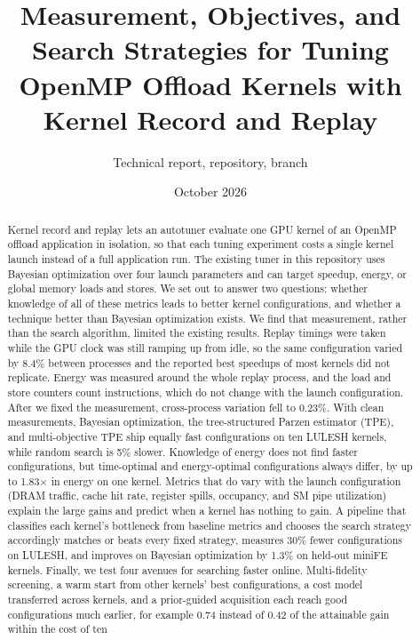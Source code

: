 \documentclass[10pt]{article}
\title{Measurement, Objectives, and Search Strategies for Tuning OpenMP Offload Kernels with Kernel Record and Replay}
\author{Technical report, \code{openmp-rr} repository, branch \code{measurement-v3}}
\date{October 2026}
\newcommand{\x}{\ensuremath{\times}}
\begin{document}
\sloppy
\maketitle

\begin{abstract}
Kernel record and replay lets an autotuner evaluate one GPU kernel of an
OpenMP offload application in isolation, so that each tuning experiment costs
a single kernel launch instead of a full application run. The existing tuner
in this repository uses Bayesian optimization over four launch parameters and
can target speedup, energy, or global memory loads and stores. We set out to
answer two questions: whether knowledge of all of these metrics leads to
better kernel configurations, and whether a technique better than Bayesian
optimization exists. We find that measurement, rather than the search
algorithm, limited the existing results. Replay timings were taken while the
GPU clock was still ramping up from idle, so the same configuration varied
by 8.4\% between processes and the reported best speedups of most kernels
did not replicate. Energy was measured around the whole replay process, and
the load and store counters count instructions, which do not change with the
launch configuration. After we fixed the measurement, cross-process variation
fell to 0.23\%. With clean measurements, Bayesian optimization, the
tree-structured Parzen estimator (TPE), and multi-objective TPE ship equally
fast configurations on ten LULESH kernels, while random search is 5\% slower.
Knowledge of energy does not find faster configurations, but time-optimal and
energy-optimal configurations always differ, by up to 1.83\x{} in energy on
one kernel. Metrics that do vary with the launch configuration (DRAM traffic,
cache hit rate, register spills, occupancy, and SM pipe utilization) explain
the large gains and predict when a kernel has nothing to gain. A pipeline that
classifies each kernel's bottleneck from baseline metrics and chooses the
search strategy accordingly matches or beats every fixed strategy, measures
30\% fewer configurations on LULESH, and improves on Bayesian optimization by
1.3\% on held-out miniFE kernels. Finally, we test four avenues for searching
faster online. Multi-fidelity screening, a warm start from other kernels'
best configurations, a cost model transferred across kernels, and a
prior-guided acquisition each reach good configurations much earlier, for
example 0.74 instead of 0.42 of the attainable gain within the cost of ten

\end{abstract}
\end{document}
